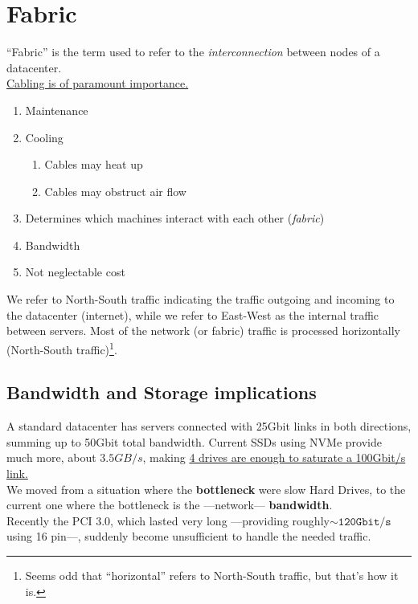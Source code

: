 \chapter{Fabric}
``Fabric'' is the term used to refer to the \textit{interconnection} between nodes of a datacenter.\\
\ul{Cabling is of paramount importance.}
\begin{enumerate}
   \item Maintenance
   \item Cooling
   \begin{enumerate}
      \item Cables may heat up
      \item Cables may obstruct air flow
   \end{enumerate}
   \item Determines which machines interact with each other (\textit{fabric})
   \item Bandwidth
   \item Not neglectable cost
\end{enumerate}

We refer to North-South traffic indicating the traffic outgoing and incoming to the datacenter (internet), while we refer to East-West as the internal traffic between servers.
Most of the network (or fabric) traffic is processed horizontally (North-South traffic)\footnote{Seems odd that ``horizontal'' refers to North-South traffic, but that's how it is.}.


\section{Bandwidth and Storage implications}
\label{sec:bandwidth_storage}
A standard datacenter has servers connected with 25Gbit links in both directions, summing up to 50Gbit total bandwidth.
Current SSDs using NVMe provide much more, about $3.5 GB/s$, making \ul{4 drives are enough to saturate a 100Gbit/s link.}\\
We moved from a situation where the \textbf{bottleneck} were slow Hard Drives, to the current one where the bottleneck is the ---network--- \textbf{bandwidth}.\\
Recently the PCI 3.0, which lasted very long ---providing roughly$\sim\texttt{120Gbit/s}$ using 16 pin---, suddenly become unsufficient to handle the needed traffic.

